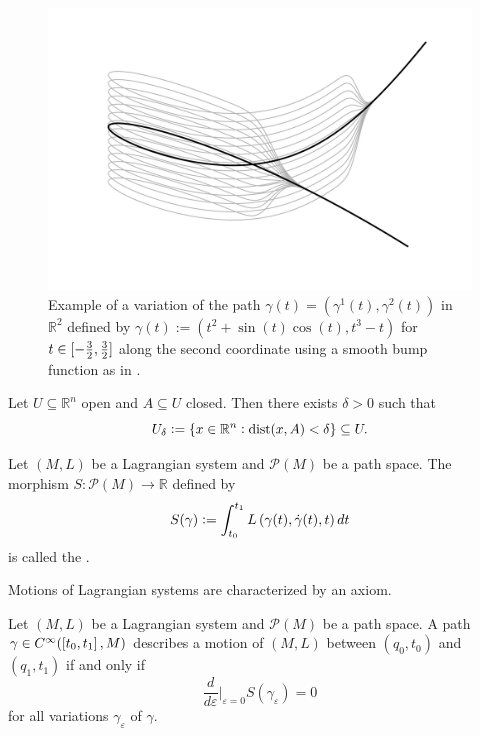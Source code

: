 \begin{example}
	\begin{figure}[h!tb]
		\centering
		\includegraphics[width = .83\textwidth]{variation.pdf}
		\caption{Example of a variation of the path $\gamma(t) = (\gamma^1(t),\gamma^2(t))$ in $\mathbb{R}^2$ defined by $\gamma(t) := (t^2 + \sin(t)\cos(t),t^3 - t)$ for $t \in \intcc[0]{-\frac{3}{2},\frac{3}{2}}$ along the second coordinate using a smooth bump function as in \cite[42]{lee:smooth_manifolds:2013}.}
		\label{fig:variation}
	\end{figure}
\end{example}

\begin{exercise}
	\label{ex:U_delta_neighbourhood}
	Let $U \subseteq \mathbb{R}^n$ open and $A \subseteq U$ closed. Then there exists $\delta > 0$ such that
	\begin{equation*}
		U_\delta := \cbr[0]{x \in \mathbb{R}^n : \dist(x,A) < \delta} \subseteq U.
	\end{equation*}
\end{exercise}

\begin{definition}
	Let $(M,L)$ be a Lagrangian system and $\mathcal{P}(M)$ be a path space. The morphism $S : \mathcal{P}(M) \to \mathbb{R}$ defined by
	\begin{equation*}
		S(\gamma) := \int_{t_0}^{t_1} L\del[0]{\gamma(t),\dot{\gamma}(t),t} dt
	\end{equation*}
	\noindent is called the .
\end{definition}

Motions of Lagrangian systems are characterized by an axiom.

\begin{axiom}
	\label{ax:Hamilton_least_action}
	Let $(M,L)$ be a Lagrangian system and $\mathcal{P}(M)$ be a path space. A path $\gamma \in C^\infty(\intcc[0]{t_0,t_1},M)$ describes a motion of $(M,L)$ between $(q_0,t_0)$ and $(q_1,t_1)$ if and only if 
	\begin{equation}
		\frac{d}{d\varepsilon}\bigg\vert_{\varepsilon = 0} S(\gamma_\varepsilon) = 0
	\end{equation}
	\noindent for all variations $\gamma_\varepsilon$ of $\gamma$.
\end{axiom}

